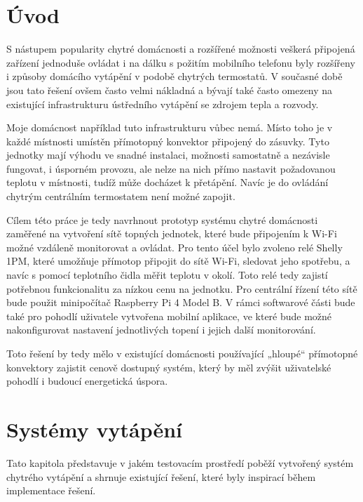 \chapter{Úvod}

S nástupem popularity chytré domácnosti a rozšířené možnosti veškerá připojená zařízení jednoduše ovládat i na dálku s požitím mobilního telefonu byly rozšířeny i způsoby domácího vytápění v podobě chytrých termostatů. V současné době jsou tato řešení ovšem často velmi nákladná a bývají také často omezeny na existující infrastrukturu ústředního vytápění se zdrojem tepla a rozvody.

Moje domácnost například tuto infrastrukturu vůbec nemá. Místo toho je v každé místnosti umístěn přímotopný konvektor připojený do zásuvky. Tyto jednotky mají výhodu ve snadné instalaci, možnosti samostatně a nezávisle fungovat, i úsporném provozu, ale nelze na nich přímo nastavit požadovanou teplotu v místnosti, tudíž může docházet k přetápění. Navíc je do ovládání chytrým centrálním termostatem není možné zapojit.

Cílem této práce je tedy navrhnout prototyp systému chytré domácnosti zaměřené na vytvoření sítě topných jednotek, které bude připojením k Wi-Fi možné vzdáleně monitorovat a ovládat. Pro tento účel bylo zvoleno relé Shelly 1PM, které umožňuje přímotop připojit do sítě Wi-Fi, sledovat jeho spotřebu, a navíc s pomocí teplotního čidla měřit teplotu v okolí. Toto relé tedy zajistí potřebnou funkcionalitu za nízkou cenu na jednotku. Pro centrální řízení této sítě bude použit minipočítač Raspberry Pi 4 Model B. V rámci softwarové části bude také pro pohodlí uživatele vytvořena mobilní aplikace, ve které bude možné nakonfigurovat nastavení jednotlivých topení i jejich další monitorování.

Toto řešení by tedy mělo v existující domácnosti používající „hloupé“ přímotopné konvektory zajistit cenově dostupný systém, který by měl zvýšit uživatelské pohodlí i budoucí energetická úspora.

\chapter{Systémy vytápění}
\label{teorie}
Tato kapitola představuje v jakém testovacím prostředí poběží vytvořený systém chytrého vytápění a shrnuje existující řešení, které byly inspirací během implementace řešení.

